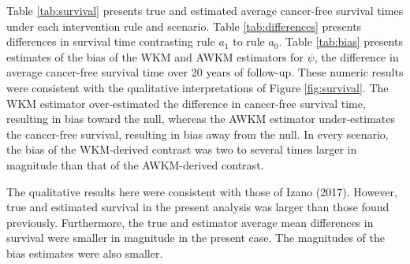 \documentclass[
  11pt,
]{article}
\begin{document}
Table \ref{tab:survival} presents true and estimated average cancer-free
survival times under each intervention rule and scenario. Table
\ref{tab:differences} presents differences in survival time contrasting
rule \(a_1\) to rule \(a_0\). Table \ref{tab:bias} presents estimates of
the bias of the WKM and AWKM estimators for \(\psi\), the difference in
average cancer-free survival time over 20 years of follow-up. These
numeric results were consistent with the qualitative interpretations of
Figure \ref{fig:survival}. The WKM estimator over-estimated the
difference in cancer-free survival time, resulting in bias toward the
null, whereas the AWKM estimator under-estimates the cancer-free
survival, resulting in bias away from the null. In every scenario, the
bias of the WKM-derived contrast was two to several times larger in
magnitude than that of the AWKM-derived contrast.

The qualitative results here were consistent with those of Izano (2017).
However, true and estimated survival in the present analysis was larger
than those found previously. Furthermore, the true and estimator average
mean differences in survival were smaller in magnitude in the present
case. The magnitudes of the bias estimates were also smaller.
\end{document}
